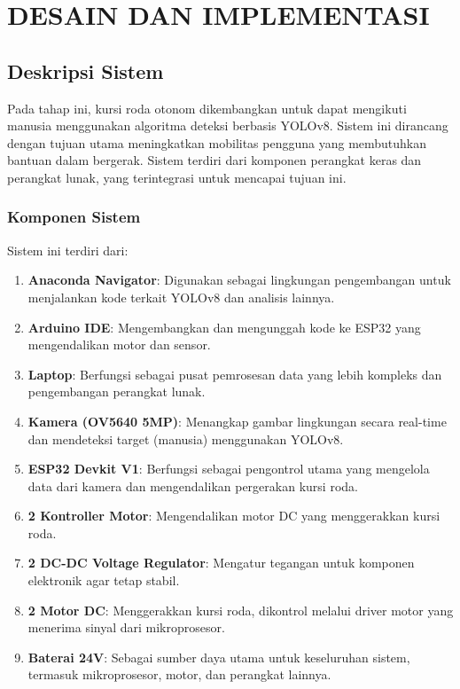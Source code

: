 \chapter{DESAIN DAN IMPLEMENTASI}
\label{chap:desainimplementasi}


\section{Deskripsi Sistem}
\label{sec:deskripsisistem}

Pada tahap ini, kursi roda otonom dikembangkan untuk dapat mengikuti manusia menggunakan algoritma deteksi berbasis YOLOv8. Sistem ini dirancang dengan tujuan utama meningkatkan mobilitas pengguna yang membutuhkan bantuan dalam bergerak. Sistem terdiri dari komponen perangkat keras dan perangkat lunak, yang terintegrasi untuk mencapai tujuan ini.

\subsection{Komponen Sistem}
\label{subsec:komponensistem}

Sistem ini terdiri dari:

\begin{enumerate}[nolistsep]
    \item \textbf{Anaconda Navigator}: Digunakan sebagai lingkungan pengembangan untuk menjalankan kode terkait YOLOv8 dan analisis lainnya.
    \item \textbf{Arduino IDE}: Mengembangkan dan mengunggah kode ke ESP32 yang mengendalikan motor dan sensor.
    \item \textbf{Laptop}: Berfungsi sebagai pusat pemrosesan data yang lebih kompleks dan pengembangan perangkat lunak.
    \item \textbf{Kamera (OV5640 5MP)}: Menangkap gambar lingkungan secara real-time dan mendeteksi target (manusia) menggunakan YOLOv8.
    \item \textbf{ESP32 Devkit V1}: Berfungsi sebagai pengontrol utama yang mengelola data dari kamera dan mengendalikan pergerakan kursi roda.
    \item \textbf{2 Kontroller Motor}: Mengendalikan motor DC yang menggerakkan kursi roda.
    \item \textbf{2 DC-DC Voltage Regulator}: Mengatur tegangan untuk komponen elektronik agar tetap stabil.
    \item \textbf{2 Motor DC}: Menggerakkan kursi roda, dikontrol melalui driver motor yang menerima sinyal dari mikroprosesor.
    \item \textbf{Baterai 24V}: Sebagai sumber daya utama untuk keseluruhan sistem, termasuk mikroprosesor, motor, dan perangkat lainnya.
\end{enumerate}

